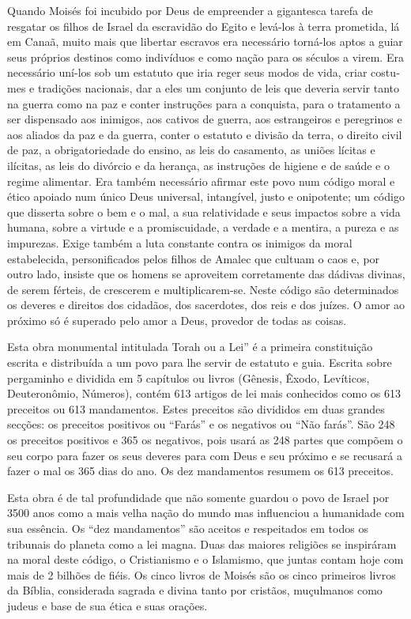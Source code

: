 Quando Moisés foi incubido por Deus de empreender a gigantesca tare­fa
de resgatar os filhos de Israel da escravidão do Egito e levá-los à
terra prometida, lá em Canaã, muito mais que libertar escravos era
necessário torná-los aptos a guiar seus próprios destinos como
indivíduos e como nação para os séculos a virem. Era necessário uní-los
sob um estatuto que iria reger seus modos de vida, criar costu­mes e
tradições nacionais, dar a eles um conjunto de leis que deveria servir
tanto na guerra como na paz e conter instruções para a conquista, para o
tratamento a ser dispensado aos inimigos, aos cativos de guerra, aos
estrangeiros e peregrinos e aos aliados da paz e da guerra, conter o
estatuto e divisão da terra, o direito civil de paz, a obrigatoriedade
do ensino, as leis do casamento, as uniões lícitas e ilícitas, as leis
do divórcio e da herança, as instruções de higiene e de saúde e o regime
alimentar. Era também necessário afirmar este povo num código moral e
ético apoia­do num único Deus universal, intangível, justo e onipotente;
um código que dis­serta sobre o bem e o mal, a sua relatividade e seus
impactos sobre a vida humana, sobre a virtude e a promiscuidade, a
verdade e a mentira, a pureza e as impurezas. Exige também a luta
constante contra os inimigos da moral estabelecida, personifi­cados
pelos filhos de Amalec que cultuam o caos e, por outro lado, insiste que
os homens se aproveitem corretamente das dádivas divinas, de serem
férteis, de cres­cerem e multiplicarem-se. Neste código são determinados
os deveres e direitos dos cidadãos, dos sacerdotes, dos reis e dos
juízes. O amor ao próximo só é superado pelo amor a Deus, provedor de
todas as coisas.

Esta obra monumental intitulada Torah ou a Lei'' é a primeira
cons­tituição escrita e distribuída a um povo para lhe servir de
estatuto e guia. Escrita sobre pergaminho e dividida em 5 capítulos ou
livros (Gênesis, Êxodo, Levíticos, Deuteronômio, Números), contém 613
artigos de lei mais conhecidos como os 613 preceitos ou 613 mandamentos.
Estes preceitos são divididos em duas grandes sec­ções: os preceitos
positivos ou ``Farás'' e os negativos ou ``Não farás''. São 248 os preceitos
positivos e 365 os negativos, pois usará as 248 partes que compõem o seu
corpo para fazer os seus deveres para com Deus e seu próximo e se
recusará a fazer o mal os 365 dias do ano. Os dez mandamentos resumem os
613 preceitos.

Esta obra é de tal profundidade que não somente guardou o povo de Israel
por 3500 anos como a mais velha nação do mundo mas influenciou a
huma­nidade com sua essência. Os ``dez mandamentos'' são aceitos e
respeitados em to­dos os tribunais do planeta como a lei magna. Duas das
maiores religiões se inspirá­ram na moral deste código, o Cristianismo e
o Islamismo, que juntas contam hoje com mais de 2 bilhões de fiéis. Os
cinco livros de Moisés são os cinco primeiros livros da Bíblia,
considerada sagrada e divina tanto por cristãos, muçulmanos como judeus
e base de sua ética e suas orações.

